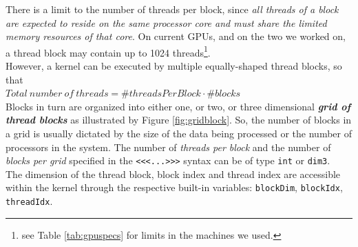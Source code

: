 
	There is a limit to the number of threads per block, since \textit{all threads of a block are expected to reside on the same processor core and must share the limited memory resources of that core}. On current GPUs, and on the two we worked on, a thread block may contain up to 1024 threads\footnote{see Table \ref{tab:gpuspecs} for limits in the machines we used.}.\\
	However, a kernel can be executed by multiple equally-shaped thread blocks, so that\\
	\(Total\  number\ of\ threads = \#threadsPerBlock \cdot \#blocks\)\\	 
	Blocks in turn are organized into either one, or two, or three dimensional \textit{\textbf{grid of thread blocks}} as illustrated by Figure \ref{fig:gridblock}.	
	So, the number of blocks in a grid is usually dictated by the size of the data being processed or the number of processors in the system.
	The number of \textit{threads per block} and the number of \textit{blocks per grid} specified in the 	\texttt{<<<...>>>} syntax can be of type \texttt{int} or \texttt{dim3}.\\
	The dimension of the thread block, block index and thread index are accessible within the kernel through the respective built-in variables: \texttt{blockDim}, \texttt{blockIdx}, \texttt{threadIdx}\cite{cudaguide}.

